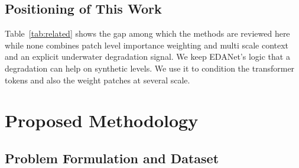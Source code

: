 \documentclass[conference]{IEEEtran}
\begin{document}
\subsection{Positioning of This Work}
Table~\ref{tab:related} shows the gap among which the methods are reviewed here while none combines patch level importance weighting and multi scale context and an explicit underwater degradation signal. We keep EDANet's logic that a degradation can help  on synthetic levels. We use it to condition the transformer tokens and also the weight patches at several scale.

\section{Proposed Methodology}
\vspace{0.3cm}
\subsection{Problem Formulation and Dataset}
\end{document}
